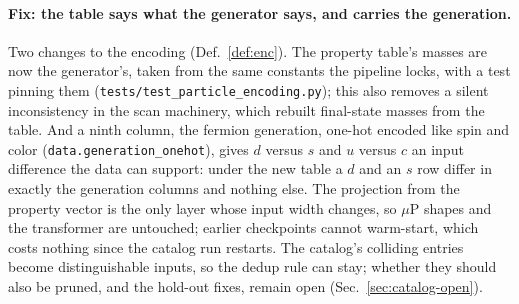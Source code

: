 \documentclass[11pt]{article}
\newcommand{\code}[1]{\texttt{#1}}
\begin{document}
\paragraph{Fix: the table says what the generator says, and carries the generation.} Two
changes to the encoding (Def.~\ref{def:enc}). The property table's masses are now the
generator's, taken from the same constants the pipeline locks, with a test pinning them
(\code{tests/test\_particle\_encoding.py}); this also removes a silent inconsistency in the
scan machinery, which rebuilt final-state masses from the table. And a ninth column, the
fermion generation, one-hot encoded like spin and color (\code{data.generation\_onehot}),
gives $d$ versus $s$ and $u$ versus $c$ an input difference the data can support: under the
new table a $d$ and an $s$ row differ in exactly the generation columns and nothing else.
The projection from the property vector is the only layer whose input width changes, so
$\mu$P shapes and the transformer are untouched; earlier checkpoints cannot warm-start,
which costs nothing since the catalog run restarts. The catalog's colliding entries become
distinguishable inputs, so the dedup rule can stay; whether they should also be pruned, and
the hold-out fixes, remain open (Sec.~\ref{sec:catalog-open}).
\end{document}
